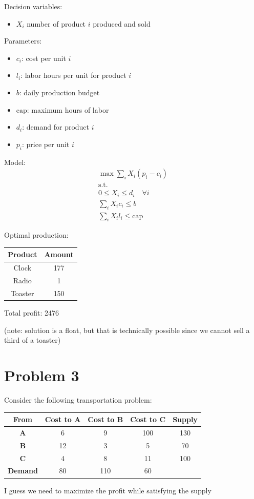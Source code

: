 \documentclass[10pt]{article}
\begin{document}
Decision variables: 
\begin{itemize}
    \item $X_i $ number of product $i $ produced and sold
\end{itemize}

Parameters:
\begin{itemize}
    \item $c_i $: cost per unit $i $
    \item $l_i $: labor hours per unit for product $i $
    \item $b $: daily production budget 
    \item $\text{cap} $: maximum hours of labor
    \item $d_i $: demand for product $i $
    \item $p_i $: price per unit $i $
\end{itemize}


Model: 
\begin{gather*}
    \max\sum_iX_i(p_i - c_i)\\
    \text{s.t.}\\
    0 \le X_i \le d_i \quad\forall i\\
    \sum_i X_ic_i\le b \\ 
    \sum_iX_il_i\le \text{cap}
\end{gather*}

Optimal production:
\begin{center}
    \begin{tabular}{|c|c|}
        \hline 
        \textbf{Product} & \textbf{Amount}\\\hline 
        Clock & 177 \\\hline 
        Radio & 1 \\\hline 
        Toaster & 150\\\hline 
    \end{tabular}
\end{center}

Total profit: 2476

(note: solution is a float, but that is technically possible since we cannot sell a third of a toaster)
\newpage 
\section{Problem 3}
Consider the following transportation problem:
\begin{center}
    \begin{tabular}{|c|c|c|c|c|}
        \hline 
        \textbf{From} & \textbf{Cost to A} & \textbf{Cost to B} & \textbf{Cost to C} & \textbf{Supply}\\\hline 
        \textbf{A} & 6 & 9 & 100 & 130\\ 
        \textbf{B} & 12 & 3 & 5 & 70\\
        \textbf{C} & 4 & 8 & 11 & 100\\\hline 
        \textbf{Demand} & 80 & 110 & 60 & \\\hline 
    \end{tabular}
\end{center}
I guess we need to maximize the profit while satisfying the supply
\end{document}
